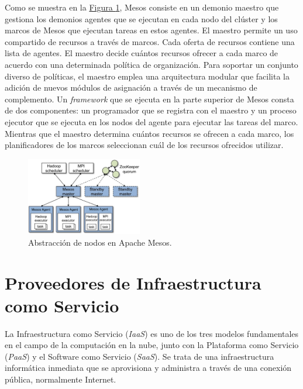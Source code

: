 
Como se muestra en la \hyperref[fig:apachemesos]{Figura \ref{fig:apachemesos}}, Mesos consiste en un demonio maestro que gestiona los demonios agentes que se ejecutan en cada nodo del clúster y los marcos de Mesos que ejecutan tareas en estos agentes. El maestro permite un uso compartido de recursos a través de marcos. Cada oferta de recursos contiene una lista de agentes. El maestro decide cuántos recursos ofrecer a cada marco de acuerdo con una determinada política de organización. Para soportar un conjunto diverso de políticas, el maestro emplea una arquitectura modular que facilita la adición de nuevos módulos de asignación a través de un mecanismo de complemento. Un \textit{framework} que se ejecuta en la parte superior de Mesos consta de dos componentes: un programador que se registra con el maestro y un proceso ejecutor que se ejecuta en los nodos del agente para ejecutar las tareas del marco. Mientras que el maestro determina cuántos recursos se ofrecen a cada marco, los planificadores de los marcos seleccionan cuál de los recursos ofrecidos utilizar.

\begin{figure}[H]
\centering
\includegraphics[width=0.45\textwidth]{images/figures/apachemesos.png}
\caption{Abstracción de nodos en Apache Mesos.\footnotemark \label{fig:apachemesos}}
\end{figure}


\section{Proveedores de Infraestructura como Servicio}

La Infraestructura como Servicio (\textit{IaaS}) es uno de los tres modelos fundamentales en el campo de la computación en la nube, junto con la Plataforma como Servicio (\textit{PaaS}) y el Software como Servicio (\textit{SaaS}). Se trata de una infraestructura informática inmediata que se aprovisiona y administra a través de una conexión pública, normalmente Internet.


